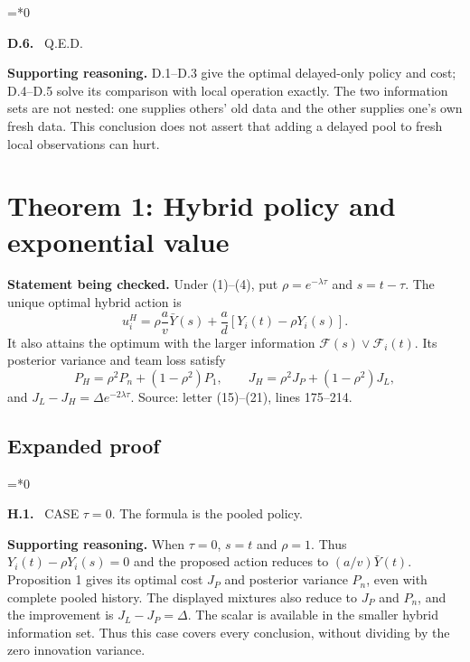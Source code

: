 \documentclass[12pt,letterpaper]{article}
\newenvironment{proofstep}[2]{%
  \begin{list}{}{\leftmargin=\dimexpr 0.17in*#2\relax%
  \setlength{\rightmargin}{0pt}\setlength{\topsep}{5pt}\setlength{\parsep}{2pt}}%
  \item[]\textbf{\textcolor{ink}{#1.}}\ }{\end{list}}
\begin{document}
\begin{proofstep}{D.6}{0}
\label{step:D.6}
Q.E.D.

\textbf{Supporting reasoning.}
D.1--D.3 give the optimal delayed-only policy and cost; D.4--D.5 solve its comparison with local operation exactly. The two information sets are not nested: one supplies others' old data and the other supplies one's own fresh data. This conclusion does not assert that adding a delayed pool to fresh local observations can hurt.
\par{}
\end{proofstep}

\clearpage
\section{Theorem 1: Hybrid policy and exponential value}\label{contract-H}

\textbf{Statement being checked.}
Under (1)--(4), put $\rho=e^{-\lambda\tau}$ and $s=t-\tau$. The unique optimal hybrid action is
\[
u_i^H=\rho\frac av\bar Y(s)+\frac ad[Y_i(t)-\rho Y_i(s)].
\]
It also attains the optimum with the larger information $\mathcal F(s)\vee\mathcal F_i(t)$. Its posterior variance and team loss satisfy
\[
P_H=\rho^2P_n+(1-\rho^2)P_1,\qquad
J_H=\rho^2J_P+(1-\rho^2)J_L,
\]
and $J_L-J_H=\Delta e^{-2\lambda\tau}$.
\noindent Source: letter (15)--(21), lines 175--214.

\subsection*{Expanded proof}

\begin{proofstep}{H.1}{0}
\label{step:H.1}
CASE $\tau=0$. The formula is the pooled policy.

\textbf{Supporting reasoning.}
When $\tau=0$, $s=t$ and $\rho=1$. Thus $Y_i(t)-\rho Y_i(s)=0$ and the proposed action reduces to $(a/v)\bar Y(t)$. Proposition 1 gives its optimal cost $J_P$ and posterior variance $P_n$, even with complete pooled history. The displayed mixtures also reduce to $J_P$ and $P_n$, and the improvement is $J_L-J_P=\Delta$. The scalar is available in the smaller hybrid information set. Thus this case covers every conclusion, without dividing by the zero innovation variance.
\par{}
\end{proofstep}
\end{document}
